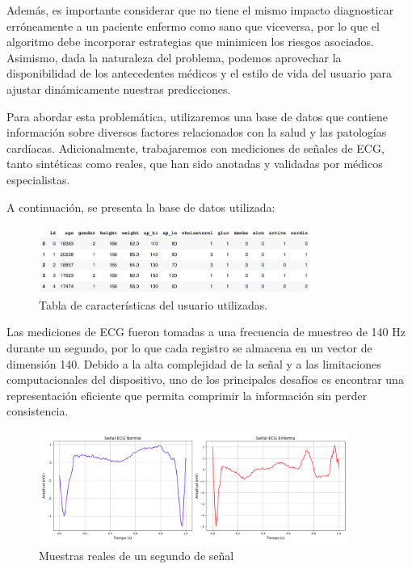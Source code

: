 \documentclass[titlepage,a4paper]{article}
\begin{document}
Además, es importante considerar que no tiene el mismo impacto diagnosticar erróneamente a un paciente enfermo como sano que viceversa, por lo que el algoritmo debe incorporar estrategias que minimicen los riesgos asociados. Asimismo, dada la naturaleza del problema, podemos aprovechar la disponibilidad de los antecedentes médicos y el estilo de vida del usuario para ajustar dinámicamente nuestras predicciones.  

Para abordar esta problemática, utilizaremos una base de datos que contiene información sobre diversos factores relacionados con la salud y las patologías cardíacas. Adicionalmente, trabajaremos con mediciones de señales de ECG, tanto sintéticas como reales, que han sido anotadas y validadas por médicos especialistas.  

A continuación, se presenta la base de datos utilizada:

\begin{figure}[h]
    \centering
    \includegraphics[width=0.8\textwidth]{tabla.png}
    \caption{Tabla de características del usuario utilizadas.}
    \label{fig:mi_figura}
\end{figure}

Las mediciones de ECG fueron tomadas a una frecuencia de muestreo de 140 Hz durante un segundo, por lo que cada registro se almacena en un vector de dimensión 140. Debido a la alta complejidad de la señal y a las limitaciones computacionales del dispositivo, uno de los principales desafíos es encontrar una representación eficiente que permita comprimir la información sin perder consistencia.  


\begin{figure}[h] %
    \centering
    \includegraphics[width=0.9\textwidth]{muestras_reales.png} %
    \caption{Muestras reales de un segundo de señal}
    \label{fig:mi_figura} %
\end{figure}
\end{document}
